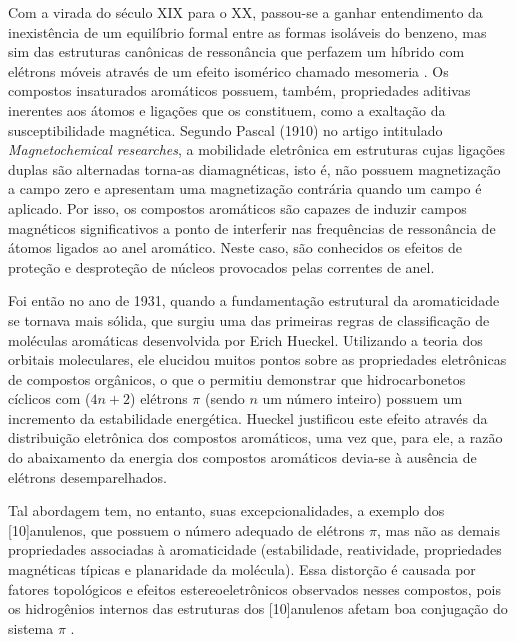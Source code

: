 Com a virada do século XIX para o XX, passou-se a ganhar entendimento da inexistência de um equilíbrio formal entre as formas isoláveis do benzeno, mas sim das estruturas canônicas de ressonância que perfazem um híbrido com elétrons móveis através de um efeito isomérico chamado mesomeria \autocite{Murrell1956, INGOLD1934, Oudar1975}. Os compostos insaturados aromáticos possuem, também, propriedades aditivas inerentes aos átomos e ligações que os constituem, como a exaltação da susceptibilidade magnética\autocite{Schleyer1996, Schleyer2001, Schleyer2014}. Segundo Pascal (1910) no artigo intitulado \textit{Magnetochemical researches}\autocite{pascal1910magnetochemical}, a mobilidade eletrônica em estruturas cujas ligações duplas são alternadas torna-as diamagnéticas, isto é, não possuem magnetização a campo zero e apresentam uma magnetização contrária quando um campo é aplicado. Por isso, os compostos aromáticos são capazes de induzir campos magnéticos significativos a ponto de interferir nas frequências de ressonância de átomos ligados ao anel aromático. Neste caso, são conhecidos os efeitos de proteção e desproteção de núcleos provocados pelas correntes de anel.

Foi então no ano de 1931, quando a fundamentação estrutural da aromaticidade se tornava mais sólida, que surgiu uma das primeiras regras de classificação de moléculas aromáticas desenvolvida por Erich Hueckel\autocite{Hckel1931}. Utilizando a teoria dos orbitais moleculares, ele elucidou muitos pontos sobre as propriedades eletrônicas de compostos orgânicos, o que o permitiu demonstrar que hidrocarbonetos cíclicos com ($4n+2$) elétrons $\pi$ (sendo $n$ um número inteiro) possuem um incremento da estabilidade energética. Hueckel\autocite{Hckel1931, Brogli1972} justificou este efeito através da distribuição eletrônica dos compostos aromáticos, uma vez que, para ele, a razão do abaixamento da energia dos compostos aromáticos devia-se à ausência de elétrons desemparelhados.

Tal abordagem tem, no entanto, suas excepcionalidades, a exemplo dos [10]anulenos, que possuem o número adequado de elétrons $\pi$, mas não as demais propriedades associadas à aromaticidade (estabilidade, reatividade, propriedades magnéticas típicas e planaridade da molécula). Essa distorção é causada por fatores topológicos e efeitos estereoeletrônicos observados nesses compostos, pois os hidrogênios internos das estruturas dos [10]anulenos afetam boa conjugação do sistema $\pi$ \autocite{Caramori2006}. 

